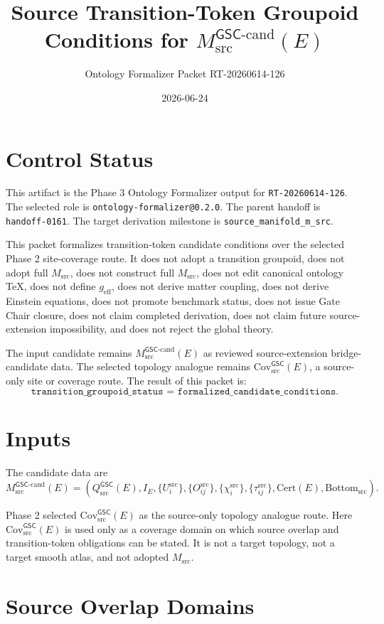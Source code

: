 \documentclass[11pt]{article}
\title{Source Transition-Token Groupoid Conditions for \(M_{\mathrm{src}}^{\mathsf{GSC}\mbox{-}\mathrm{cand}}(E)\)}
\author{Ontology Formalizer Packet RT-20260614-126}
\date{2026-06-24}
\newcommand{\GSC}{\mathsf{GSC}}
\newcommand{\Msrc}{M_{\mathrm{src}}}
\newcommand{\Mgsccand}{M_{\mathrm{src}}^{\GSC\mbox{-}\mathrm{cand}}}
\newcommand{\Qsrc}{Q_{\mathrm{src}}^{\GSC}}
\newcommand{\Bottomsrc}{\mathrm{Bottom}_{\mathrm{src}}}
\newcommand{\Covsrc}{\mathrm{Cov}_{\mathrm{src}}^{\GSC}}
\newcommand{\geff}{g_{\mathrm{eff}}}
\begin{document}
\maketitle

\section{Control Status}

This artifact is the Phase 3 Ontology Formalizer output for
\texttt{RT-20260614-126}. The selected role is
\texttt{ontology-formalizer@0.2.0}. The parent handoff is
\texttt{handoff-0161}. The target derivation milestone is
\texttt{source\_manifold\_m\_src}.

This packet formalizes transition-token candidate conditions over the selected
Phase 2 site-coverage route. It does not adopt a transition groupoid, does not
adopt full \(\Msrc\), does not construct full \(\Msrc\), does not edit
canonical ontology TeX, does not define \(\geff\), does not derive matter
coupling, does not derive Einstein equations, does not promote benchmark
status, does not issue Gate Chair closure, does not claim completed
derivation, does not claim future source-extension impossibility, and does
not reject the global theory.

The input candidate remains \(\Mgsccand(E)\) as reviewed source-extension
bridge-candidate data. The selected topology analogue remains
\(\Covsrc(E)\), a source-only site or coverage route. The result of this
packet is:
\[
  \texttt{transition\_groupoid\_status = formalized\_candidate\_conditions}.
\]

\section{Inputs}

The candidate data are
\[
  \Mgsccand(E)=
  \left(
  \Qsrc(E),
  I_E,
  \{U_i^{\mathrm{src}}\},
  \{O_{ij}^{\mathrm{src}}\},
  \{\chi_i^{\mathrm{src}}\},
  \{\tau_{ij}^{\mathrm{src}}\},
  \mathrm{Cert}(E),
  \Bottomsrc
  \right).
\]

Phase 2 selected \(\Covsrc(E)\) as the source-only topology analogue route.
Here \(\Covsrc(E)\) is used only as a coverage domain on which source overlap
and transition-token obligations can be stated. It is not a target topology,
not a target smooth atlas, and not adopted \(\Msrc\).

\section{Source Overlap Domains}
\end{document}
